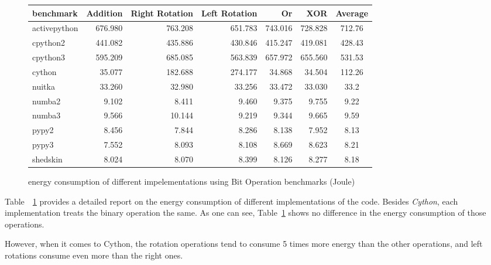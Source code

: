 \begin{figure}[!hbt]
    \begin{tabular}{|lrrrrr|c|}
        \toprule
        benchmark    & Addition & Right Rotation & Left Rotation & Or      & XOR     & Average \\
        \midrule
        activepython & 676.980  & 763.208        & 651.783       & 743.016 & 728.828 & 712.76  \\
        cpython2     & 441.082  & 435.886        & 430.846       & 415.247 & 419.081 & 428.43  \\
        cpython3     & 595.209  & 685.085        & 563.839       & 657.972 & 655.560 & 531.53  \\
        \hline
        cython       & 35.077   & 182.688        & 274.177       & 34.868  & 34.504  & 112.26  \\
        nuitka       & 33.260   & 32.980         & 33.256        & 33.472  & 33.030  & 33.2    \\
        \hline
        numba2       & 9.102    & 8.411          & 9.460         & 9.375   & 9.755   & 9.22    \\
        numba3       & 9.566    & 10.144         & 9.219         & 9.344   & 9.665   & 9.59    \\
        pypy2        & 8.456    & 7.844          & 8.286         & 8.138   & 7.952   & 8.13    \\
        pypy3        & 7.552    & 8.093          & 8.108         & 8.669   & 8.623   & 8.21    \\
        shedskin     & 8.024    & 8.070          & 8.399         & 8.126   & 8.277   & 8.18    \\
        \bottomrule
    \end{tabular}
    \caption{energy consumption of different impelementations using Bit Operation benchmarks (Joule) }
    \label{table:bitops}
\end{figure}


Table~~\ref{table:bitops} provides a detailed report on the energy consumption of different implementations of the code.
Besides \emph{Cython}, each implementation treats the binary operation the same. As one can see, Table~\ref{table:bitops} shows no difference in the energy consumption of those operations.

However, when it comes to Cython, the rotation operations tend to consume 5 times more energy than the other operations, and left rotations consume even more than the right ones.

